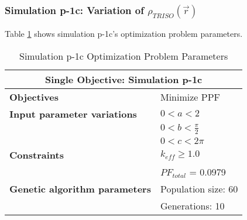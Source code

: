\subsubsection{Simulation p-1c: Variation of $\rho_{TRISO}(\vec{r})$}
Table \ref{tab:simulationp1c} shows simulation p-1c's optimization problem parameters. 
\begin{table}[htbp!]
    \centering
    \onehalfspacing
    \caption{Simulation p-1c Optimization Problem Parameters}
	\label{tab:simulationp1c}
    \footnotesize
    \begin{tabular}{l|p{3cm}}
    \hline 
    \multicolumn{2}{c}{\textbf{Single Objective: Simulation p-1c}} \\
    \hline 
    \textbf{Objectives} & Minimize PPF \\
    \hline 
    \textbf{Input parameter variations} & $0<a<2$ \\
    & $0<b<\frac{\pi}{2}$ \\
    & $0<c<2\pi$ \\
    \hline
    \textbf{Constraints} & $k_{eff} \geq 1.0$\\ 
    & $PF_{total}$ = 0.0979\\
    \hline 
    \textbf{Genetic algorithm parameters} & Population size: 60 \\
    & Generations: 10 \\
    \hline
    \end{tabular}
\end{table}

